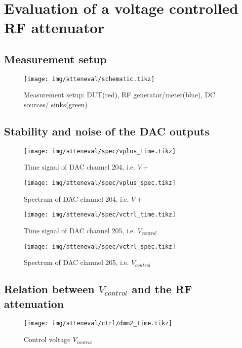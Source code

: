 \chapter{Evaluation of a voltage controlled RF attenuator}
\section{Measurement setup}

\begin{figure}[H]
	\centering
	\texttt{[image: img/atteneval/schematic.tikz]}
	\caption{Measurement setup: DUT(red), RF generator/meter(blue), DC sources/ sinks(green)}
	\label{fig:atteneval-setup}
\end{figure}

\newpage
\section{Stability and noise of the DAC outputs}

\begin{figure}[H]
	\centering
	\texttt{[image: img/atteneval/spec/vplus\_time.tikz]}
	\caption{Time signal of DAC channel 204, i.e. $V+$}
	\label{fig:vplus_time}
\end{figure}

\begin{figure}[H]
	\centering
	\texttt{[image: img/atteneval/spec/vplus\_spec.tikz]}
	\caption{Spectrum of DAC channel 204, i.e. $V+$}
	\label{fig:vplus_spec}
\end{figure}


\begin{figure}[H]
	\centering
	\texttt{[image: img/atteneval/spec/vctrl\_time.tikz]}
	\caption{Time signal of DAC channel 205, i.e. $V_{control}$}
	\label{fig:vctrl_time}
\end{figure}

\begin{figure}[H]
	\centering
	\texttt{[image: img/atteneval/spec/vctrl\_spec.tikz]}
	\caption{Spectrum of DAC channel 205, i.e. $V_{control}$}
	\label{fig:vctrl_spec}
\end{figure}





\newpage
\section{Relation between $V_{control}$ and the RF attenuation}
\begin{figure}[H]
	\centering
	\texttt{[image: img/atteneval/ctrl/dmm2\_time.tikz]}
	\caption{Control voltage $V_{control}$}
	\label{fig:vctrl_spec}
\end{figure}

